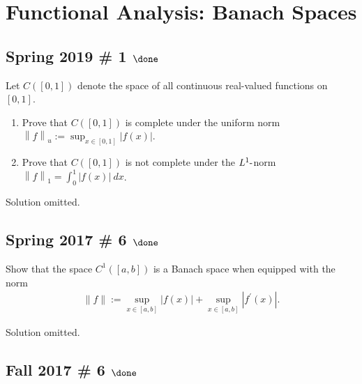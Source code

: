 \hypertarget{functional-analysis-banach-spaces}{%
\section{Functional Analysis: Banach
Spaces}\label{functional-analysis-banach-spaces}}

\hypertarget{spring-2019-1-done}{%
\subsection{\texorpdfstring{Spring 2019 \# 1
\(\done\)}{Spring 2019 \# 1 \textbackslash done}}\label{spring-2019-1-done}}

Let \(C([0, 1])\) denote the space of all continuous real-valued
functions on \([0, 1]\).

\begin{enumerate}
\def\labelenumi{\alph{enumi}.}
\item
  Prove that \(C([0, 1])\) is complete under the uniform norm
  \({\left\lVert {f} \right\rVert}_u := \displaystyle\sup_{x\in [0,1]} |f (x)|\).
\item
  Prove that \(C([0, 1])\) is not complete under the
  \(L^1{\hbox{-}}\)norm
  \({\left\lVert {f} \right\rVert}_1 = \displaystyle\int_0^1 |f (x)| ~dx\).
\end{enumerate}


Solution omitted.

\hypertarget{spring-2017-6-done}{%
\subsection{\texorpdfstring{Spring 2017 \# 6
\(\done\)}{Spring 2017 \# 6 \textbackslash done}}\label{spring-2017-6-done}}

Show that the space \(C^1([a, b])\) is a Banach space when equipped with
the norm
\begin{align*}
\|f\|:=\sup _{x \in[a, b]}|f(x)|+\sup _{x \in[a, b]}\left|f^{\prime}(x)\right|.
\end{align*}


Solution omitted.

\hypertarget{fall-2017-6-done}{%
\subsection{\texorpdfstring{Fall 2017 \# 6
\(\done\)}{Fall 2017 \# 6 \textbackslash done}}\label{fall-2017-6-done}}

